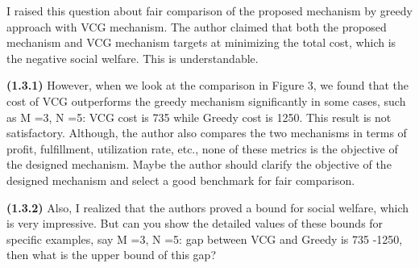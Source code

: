 \begin{revcomment}[1.3]
	I raised this question about fair comparison of the proposed mechanism by greedy approach with VCG mechanism. The author claimed that both the proposed mechanism and VCG mechanism targets at minimizing the total cost, which is the negative social welfare. This is understandable. 
    
    \textbf{(1.3.1)} However, when we look at the comparison in Figure 3, we found that the cost of VCG outperforms the greedy mechanism significantly in some cases, such as M =3, N =5: VCG cost is 735 while Greedy cost is 1250. This result is not satisfactory. Although, the author also compares the two mechanisms in terms of profit, fulfillment, utilization rate, etc., none of these metrics is the objective of the designed mechanism. Maybe the author should clarify the objective of the designed mechanism and select a good benchmark for fair comparison. 

    \textbf{(1.3.2)} Also, I realized that the authors proved a bound for social welfare, which is very impressive. But can you show the detailed values of these bounds for specific examples, say M =3, N =5: gap between VCG and Greedy is 735 -1250, then what is the upper bound of this gap? 
\end{revcomment}

